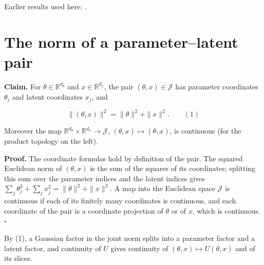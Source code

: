 \documentclass[11pt,a4paper]{article}
\begin{document}
Earlier results used here: \cite[Section~3.26]{LangevinLean2026ULASC}.

\section{\texorpdfstring{The norm of a parameter–latent pair}{The norm of a parameter–latent pair}}


\textbf{Claim.} For \(\theta\in\mathbb R^{d_\theta}\) and \(x\in\mathbb R^{d_x}\), the pair \((\theta,x)\in\mathcal J\) has parameter coordinates \(\theta_j\) and latent coordinates \(x_j\), and


\[\|(\theta,x)\|^2=\|\theta\|^2+\|x\|^2 .\qquad(1)\]


Moreover the map \(\mathbb R^{d_\theta}\times\mathbb R^{d_x}\to\mathcal J\), \((\theta,x)\mapsto(\theta,x)\), is continuous (for the product topology on the left).




\textbf{Proof.} The coordinate formulas hold by definition of the pair. The squared Euclidean norm of \((\theta,x)\) is the sum of the squares of its coordinates; splitting this sum over the parameter indices and the latent indices gives \(\sum_j\theta_j^2+\sum_jx_j^2=\|\theta\|^2+\|x\|^2\). A map into the Euclidean space \(\mathcal J\) is continuous if each of its finitely many coordinates is continuous, and each coordinate of the pair is a coordinate projection of \(\theta\) or of \(x\), which is continuous. \(\square\)




By (1), a Gaussian factor in the joint norm splits into a parameter factor and a latent factor, and continuity of \(U\) gives continuity of \((\theta,x)\mapsto U(\theta,x)\) and of its slices.
\end{document}

